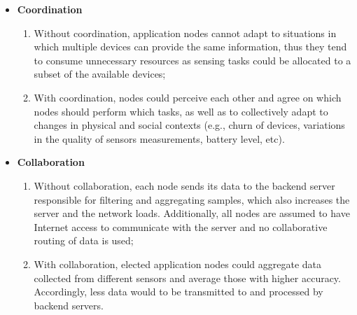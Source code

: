 \begin{itemize}
	
	\item \textbf{Coordination}
	
	\begin{enumerate}[label=-]
		
		\item Without coordination, application nodes cannot adapt to situations in which multiple devices can provide the same information, thus they tend to consume unnecessary resources as sensing tasks could be allocated to a subset of the available devices;
		
		\item With coordination, nodes could perceive each other and agree on which nodes should perform which tasks, as well as to collectively adapt to changes in physical and social contexts (e.g., churn of devices, variations in the quality of sensors measurements, battery level, etc). 
		
	\end{enumerate}
	
	\item \textbf{Collaboration}
	
	\begin{enumerate}[label=-]
		
		\item Without collaboration, each node sends its data to the backend server responsible for filtering and aggregating samples, which also increases the server and the network loads. Additionally, all nodes are assumed to have Internet access to communicate with the server and no collaborative routing of data is used;
		
		\item With collaboration, elected application nodes could aggregate data collected from different sensors and average those with higher accuracy. Accordingly, less data would to be transmitted to and processed by backend servers.
		
	\end{enumerate}
\end{itemize}
